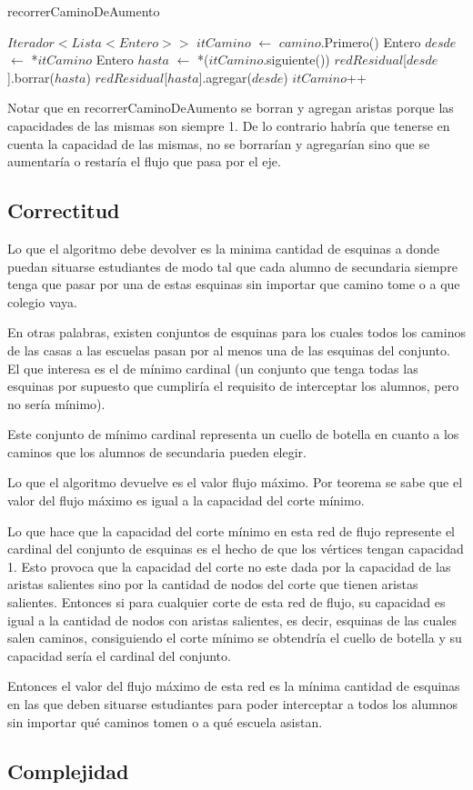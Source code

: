 \begin{algorithm}[]
	\caption{recorrerCaminoDeAumento}

	$Iterador<Lista<Entero>>$ $itCamino$ $\gets$ $camino$.Primero() \;
	 {
		Entero $desde$ $\gets$ *$itCamino$ \;
		Entero $hasta$ $\gets$ *($itCamino$.siguiente()) \;
		$redResidual$[$desde$].borrar($hasta$) \;
		$redResidual$[$hasta$].agregar($desde$) \;
		$itCamino$++ \;
	}
\end{algorithm}

Notar que en recorrerCaminoDeAumento se borran y agregan aristas porque las capacidades de las mismas son siempre 1. De lo contrario habría que tenerse en cuenta la capacidad de las mismas, no se borrarían y agregarían sino que se aumentaría o restaría el flujo que pasa por el eje.

\subsection{Correctitud}

Lo que el algoritmo debe devolver es la minima cantidad de esquinas a donde puedan situarse estudiantes de modo tal que cada alumno de secundaria siempre tenga que pasar por una de estas esquinas sin importar que camino tome o a que colegio vaya.

En otras palabras, existen conjuntos de esquinas para los cuales todos los caminos de las casas a las escuelas pasan por al menos una de las esquinas del conjunto. El que interesa es el de mínimo cardinal (un conjunto que tenga todas las esquinas por supuesto que cumpliría el requisito de interceptar los alumnos, pero no sería mínimo).

Este conjunto de mínimo cardinal representa un cuello de botella en cuanto a los caminos que los alumnos de secundaria pueden elegir.

Lo que el algoritmo devuelve es el valor flujo máximo. Por teorema se sabe que el valor del flujo máximo es igual a la capacidad del corte mínimo.

Lo que hace que la capacidad del corte mínimo en esta red de flujo represente el cardinal del conjunto de esquinas es el hecho de que los vértices tengan capacidad 1. Esto provoca que la capacidad del corte no este dada por la capacidad de las aristas salientes sino por la cantidad de nodos del corte que tienen aristas salientes. Entonces si para cualquier corte de esta red de flujo, su capacidad es igual a la cantidad de nodos con aristas salientes, es decir, esquinas de las cuales salen caminos, consiguiendo el corte mínimo se obtendría el cuello de botella y su capacidad sería el cardinal del conjunto.

Entonces el valor del flujo máximo de esta red es la mínima cantidad de esquinas en las que deben situarse estudiantes para poder interceptar a todos los alumnos sin importar qué caminos tomen o a qué escuela asistan.

\subsection{Complejidad}

